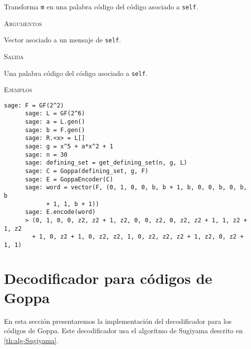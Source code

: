 \begin{description}[leftmargin=1em, font=\normalfont\ttfamily, style=nextline]
\begin{description}[font=\ttfamily, style=nextline]
    \item[encode(self, m)] Transforma \texttt{m} en una palabra código del código asociado a \texttt{self}.

    \textsc{Argumentos}
    \begin{description}[font=\normalfont\ttfamily]
        \item[m] Vector asociado a un mensaje de \texttt{self}.
    \end{description}

    \textsc{Salida}
    \begin{description}[font=\normalfont\ttfamily]
        \item[] Una palabra código del código asociado a \texttt{self}.
    \end{description}

    \textsc{Ejemplos}
    \begin{lstlisting}[gobble=4]
      sage: F = GF(2^2)
      sage: L = GF(2^6)
      sage: a = L.gen()
      sage: b = F.gen()
      sage: R.<x> = L[]
      sage: g = x^5 + a*x^2 + 1
      sage: n = 30
      sage: defining_set = get_defining_set(n, g, L)
      sage: C = Goppa(defining_set, g, F)
      sage: E = GoppaEncoder(C)
      sage: word = vector(F, (0, 1, 0, 0, b, b + 1, b, 0, 0, b, 0, b, b 
            + 1, 1, b + 1))
      sage: E.encode(word)
      > (0, 1, 0, 0, z2, z2 + 1, z2, 0, 0, z2, 0, z2, z2 + 1, 1, z2 + 1, z2 
        + 1, 0, z2 + 1, 0, z2, z2, 1, 0, z2, z2, z2 + 1, z2, 0, z2 + 1, 1)
    \end{lstlisting}
  \end{description}
\end{description}

\section{Decodificador para códigos de Goppa}

En esta sección presentaremos la implementación del decodificador para los códigos de Goppa. Este decodificador usa el algoritmo de Sugiyama descrito en \ref{th:alg-Sugiyama}.

